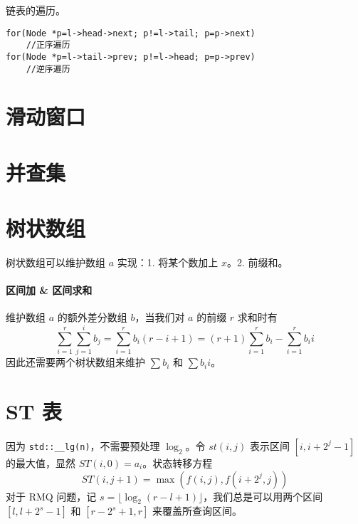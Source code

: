 \documentclass{probook}
\begin{document}
\begin{multicols}{2}
链表的遍历。

\begin{lstlisting}[style=cpp]
for(Node *p=l->head->next; p!=l->tail; p=p->next)
	//正序遍历
for(Node *p=l->tail->prev; p!=l->head; p=p->prev)
	//逆序遍历
\end{lstlisting}

\section{滑动窗口}



\section{并查集}



\section{树状数组}

树状数组可以维护数组 $a$ 实现：1. 将某个数加上 $x$。2. 前缀和。



\paragraph{区间加 \& 区间求和}

维护数组 $a$ 的额外差分数组 $b$，当我们对 $a$ 的前缀 $r$ 求和时有
\[ \sum_{i=1}^r \sum_{j=1}^i b_j = \sum_{i=1}^rb_i(r-i+1) = (r+1)\sum_{i=1}^rb_i - \sum_{i=1}^rb_ii \]
因此还需要两个树状数组来维护 $\sum b_i$ 和 $\sum b_ii$。



\section{ST 表}

因为 \lstinline{std::__lg(n)}，不需要预处理 $\log_2$。令 $st(i,j)$ 表示区间 $[i,i+2^j-1]$ 的最大值，显然 $ST(i,0)=a_i$。状态转移方程
\[ ST(i,j+1) = \max(f(i,j) , f(i+2^{j},j)) \]
对于 RMQ 问题，记 $s = \lfloor\log_2(r-l+1)\rfloor$，我们总是可以用两个区间 $[l,l+2^s-1]$ 和 $[r-2^s+1,r]$ 来覆盖所查询区间。


\end{multicols}
\end{document}
